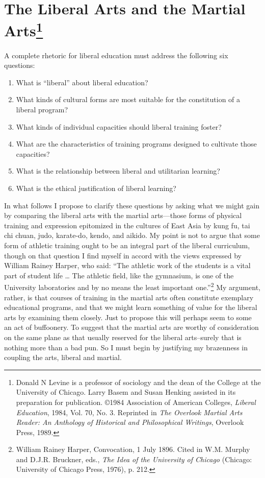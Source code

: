 \chapter[The Liberal Arts and the Martial Arts (1984)]{The Liberal Arts and the Martial Arts\footnote{Donald N Levine is a professor of sociology and the dean of the College at the University of Chicago. Larry Basem and Susan Henking assisted in its preparation for publication. \copyright{}1984 Association of American Colleges, \emph{Liberal Education}, 1984, Vol. 70, No. 3. Reprinted in \emph{The Overlook Martial Arts Reader: An Anthology of Historical and Philosophical Writings}, Overlook Press, 1989.}}

A complete rhetoric for liberal education must address the following six questions: 

\begin{enumerate}
\item What is ``liberal'' about liberal education?
\item What kinds of cultural forms are most suitable for the constitution of a liberal program?
\item What kinds of individual capacities should liberal training foster?
\item What are the characteristics of training programs designed to cultivate those capacities?
\item What is the relationship between liberal and utilitarian learning?
\item What is the ethical justification of liberal learning?
\end{enumerate}

In what follows I propose to clarify these questions by asking what we might gain by comparing the liberal arts with the martial arts---those forms of physical training and expression epitomized in the cultures of East Asia by kung fu, tai chi chuan, judo, karate-do, kendo, and aikido. My point is not to argue that some form of athletic training ought to be an integral part of the liberal curriculum, though on that question I find myself in accord with the views expressed by William Rainey Harper, who said: ``The athletic work of the students is a vital part of student life \ldots{} The athletic field, like the gymnasium, is one of the University laboratories and by no means the least important one.''\footnote{William Rainey Harper, Convocation, 1 July 1896. Cited in W.M. Murphy and D.J.R. Bruckner, eds., \emph{The Idea of the University of Chicago} (Chicago: University of Chicago Press, 1976), p. 212.} My argument, rather, is that courses of training in the martial arts often constitute exemplary educational programs, and that we might learn something of value for the liberal arts by examining them closely. Just to propose this will perhaps seem to some an act of buffoonery. To suggest that the martial arts are worthy of consideration on the same plane as that usually reserved for the liberal arts--surely that is nothing more than a bad pun. So I must begin by justifying my brazenness in coupling the arts, liberal and martial.

